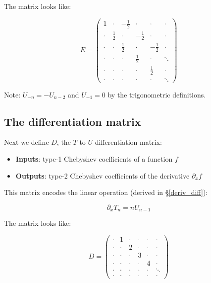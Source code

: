 \documentclass{article}
\begin{document}
The matrix looks like:

\begin{equation*}
\renewcommand*{\arraystretch}{1.5}
E =
\begin{pmatrix}
1 & \cdot & -\frac{1}{2} & \cdot & \cdot & \cdot \\
\cdot & \frac{1}{2} & \cdot & -\frac{1}{2} & \cdot & \cdot \\
\cdot & \cdot & \frac{1}{2} & \cdot & -\frac{1}{2} & \cdot \\
\cdot & \cdot & \cdot & \frac{1}{2} & \cdot & \ddots \\
\cdot & \cdot & \cdot & \cdot & \frac{1}{2} & \cdot \\
\cdot & \cdot & \cdot & \cdot & \cdot & \ddots
\end{pmatrix}
\end{equation*}

Note: $U_{-n} = - U_{n-2}$ and $U_{-1} = 0$ by the trigonometric definitions. 

\subsection{The differentiation matrix}

Next we define $D$, the $T$-to-$U$ differentiation matrix:

\begin{itemize}
    \item \textbf{Inputs}: type-1 Chebyshev coefficients of a function $f$
    \item \textbf{Outputs}: type-2 Chebyshev coefficients of the derivative $\partial_x f$
\end{itemize}

This matrix encodes the linear operation (derived in \S \ref{deriv_diff}):

\begin{equation*}
\partial_x T_n = n U_{n-1}
\end{equation*}

The matrix looks like:

\begin{equation*}
\renewcommand*{\arraystretch}{1.2}
D =
\begin{pmatrix}
\cdot & 1 & \cdot & \cdot & \cdot & \cdot \\
\cdot & \cdot & 2 & \cdot & \cdot & \cdot \\
\cdot & \cdot & \cdot & 3 & \cdot & \cdot \\
\cdot & \cdot & \cdot & \cdot & 4 & \cdot \\
\cdot & \cdot & \cdot & \cdot & \cdot & \ddots \\
\cdot & \cdot & \cdot & \cdot & \cdot & \cdot
\end{pmatrix}
\end{equation*}
\end{document}
